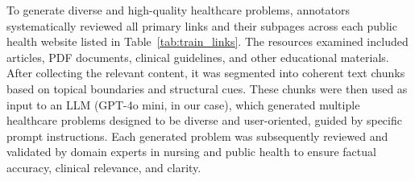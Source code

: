 To generate diverse and high-quality healthcare problems, annotators systematically reviewed all primary links and their subpages across each public health website listed in Table~\ref{tab:train_links}. The resources examined included articles, PDF documents, clinical guidelines, and other educational materials. After collecting the relevant content, it was segmented into coherent text chunks based on topical boundaries and structural cues. These chunks were then used as input to an LLM (GPT-4o mini, in our case), which generated multiple healthcare problems designed to be diverse and user-oriented, guided by specific prompt instructions.
Each generated problem was subsequently reviewed and validated by domain experts in nursing and public health to ensure factual accuracy, clinical relevance, and clarity.

\begin{table}[h]
    \centering
    \caption{Biographies of all annotators involved in \repqa construction.}
    \label{tab:biography}
\end{table}

